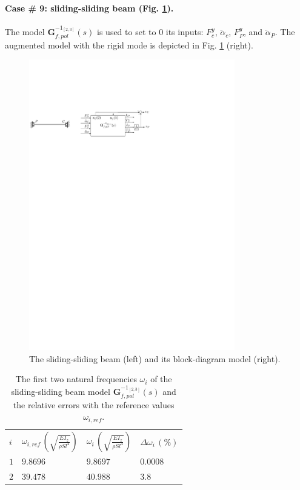 \documentclass[smallcondensed]{svjour3}     %
\begin{document}
\FloatBarrier
\paragraph{Case \# 9: sliding-sliding beam (Fig. \ref{fig:Tss}).} The model $\mathbf{G}_{f,pol}^{-1_{[2,3]}}(s)$ is used to set to $0$ its inputs: $F^y_c$, $\ddot{\alpha}_c$, $F^y_P$, and $\ddot{\alpha}_P$. The augmented model with the rigid mode is depicted in Fig. \ref{fig:Tss} (right).
\begin{figure}[htbp!]
  \includegraphics[width=0.8\textwidth]{Tssb}
\caption{The sliding-sliding beam (left) and its block-diagram model (right).}
\label{fig:Tss} 
\end{figure}
\begin{table}[htbp!]
\caption{The first two natural frequencies $\omega_i$ of the sliding-sliding beam model $\mathbf{G}_{f,pol}^{-1_{[2,3]}}(s)$ and the relative errors with the reference values $\omega_{i,ref}$.}
\label{tab:Tss}       %
\begin{tabular}{llll}
\hline\noalign{\smallskip}
  $i$ & $\omega_{i,ref}\,\left(\sqrt{\frac{EI_z}{\rho S l^4}}\right)$ &  $\omega_i\,\left(\sqrt{\frac{EI_z}{\rho S l^4}}\right)$ &  $\Delta \omega_i\,(\%)$ \\
\noalign{\smallskip}\hline\noalign{\smallskip}
$1$ & $9.8696$ & $9.8697$ & $0.0008$ \\ 
$2$ & $39.478$ & $40.988$ & $3.8$ \\
\hline
\end{tabular}
\end{table}
\end{document}
